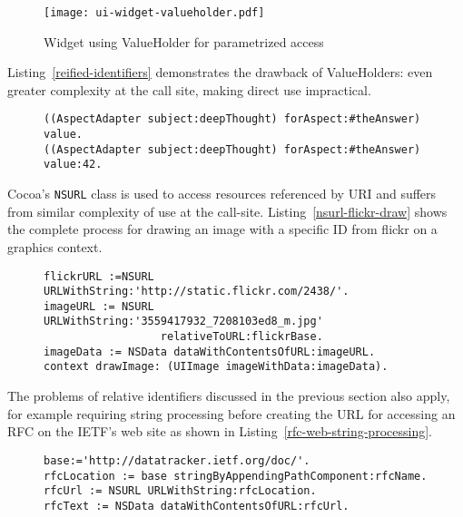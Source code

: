 \documentclass[preprint,authoryear]{llncs}
\begin{document}
\begin{figure}[htbp]
\begin{center}
\texttt{[image: ui-widget-valueholder.pdf]}
\caption{Widget using ValueHolder for parametrized access}
\label{ui-widget-valueholder}
\end{center}
\end{figure}

Listing~\ref{reified-identifiers} demonstrates the drawback of ValueHolders:  even greater complexity at the
call site, making direct use impractical. 


\begin{figure}[htbp]
\begin{lstlisting}[style=numbers,label=reified-identifiers,caption=Retrieve and store value via AspectAdaptor ValueHolder.]
((AspectAdapter subject:deepThought) forAspect:#theAnswer) value.
((AspectAdapter subject:deepThought) forAspect:#theAnswer) value:42.
\end{lstlisting}
\end{figure}

Cocoa's {\tt NSURL} class is used to access resources referenced by URI and suffers from similar complexity
of use at the call-site.  Listing~\ref{nsurl-flickr-draw}
shows the complete process for drawing an image with a specific ID from flickr on a graphics context.

\begin{figure}[htbp]
\begin{lstlisting}[style=numbers,label=nsurl-flickr-draw,caption=Retrieving and drawing an image stored on flickr.com.]
flickrURL :=NSURL URLWithString:'http://static.flickr.com/2438/'.
imageURL := NSURL URLWithString:'3559417932_7208103ed8_m.jpg'
                  relativeToURL:flickrBase.
imageData := NSData dataWithContentsOfURL:imageURL.
context drawImage: (UIImage imageWithData:imageData).
\end{lstlisting}
\end{figure}



The problems of relative identifiers discussed in the previous section also apply, for example requiring
string processing before creating the URL for accessing an RFC on the IETF's web site as shown in Listing~\ref{rfc-web-string-processing}.  

\begin{figure}[htbp]
\begin{lstlisting}[style=numbers,label=rfc-web-string-processing,caption=Retrieving a specific RFC (I).]
base:='http://datatracker.ietf.org/doc/'.
rfcLocation := base stringByAppendingPathComponent:rfcName.
rfcUrl := NSURL URLWithString:rfcLocation.
rfcText := NSData dataWithContentsOfURL:rfcUrl.
\end{lstlisting}
\end{figure}
\end{document}
